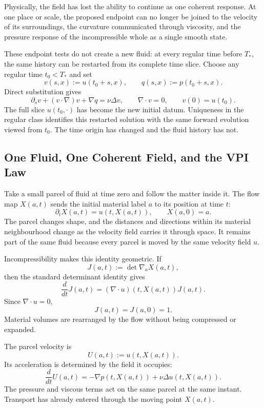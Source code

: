 Physically, the field has lost the ability to continue as one coherent response.
At one place or scale, the proposed endpoint can no longer be joined to the velocity of its surroundings, the curvature communicated through viscosity, and the pressure response of the incompressible whole as a single smooth state.


These endpoint tests do not create a new fluid: at every regular time before \(T_*\), the same history can be restarted from its complete time slice.
Choose any regular time \(t_0<T_*\) and set
\[
  v(s,x):=u(t_0+s,x),
  \qquad
  q(s,x):=p(t_0+s,x).
\]
Direct substitution gives
\[
  \partial_sv+(v\cdot\nabla)v+\nabla q
  =
  \nu\Delta v,
  \qquad
  \nabla\cdot v=0,
  \qquad
  v(0)=u(t_0).
\]
The full slice \(u(t_0,\cdot)\) has become the new initial datum.
Uniqueness in the regular class identifies this restarted solution with the same forward evolution viewed from \(t_0\).
The time origin has changed and the fluid history has not.

\subsection{One Fluid, One Coherent Field, and the VPI Law}\label{sub:OneFluidOneCoherentFieldAndTheVPILaw}

Take a small parcel of fluid at time zero and follow the matter inside it.
The flow map \(X(a,t)\) sends the initial material label \(a\) to its position at time \(t\):
\[
  \partial_tX(a,t)=u(t,X(a,t)),
  \qquad
  X(a,0)=a.
\]
The parcel changes shape, and the distances and directions within its material neighbourhood change as the velocity field carries it through space.
It remains part of the same fluid because every parcel is moved by the same velocity field \(u\).

Incompressibility makes this identity geometric.
If
\[
  J(a,t):=\det\nabla_aX(a,t),
\]
then the standard determinant identity gives
\[
  \frac{d}{dt}J(a,t)
  =
  (\nabla\cdot u)(t,X(a,t))J(a,t).
\]
Since \(\nabla\cdot u=0\),
\[
  J(a,t)=J(a,0)=1.
\]
Material volumes are rearranged by the flow without being compressed or expanded.

The parcel velocity is
\[
  U(a,t):=u(t,X(a,t)).
\]
Its acceleration is determined by the field it occupies:
\[
  \frac{d}{dt}U(a,t)
  =
  -\nabla p(t,X(a,t))
  +
  \nu\Delta u(t,X(a,t)).
\]
The pressure and viscous terms act on the same parcel at the same instant.
Transport has already entered through the moving point \(X(a,t)\).

